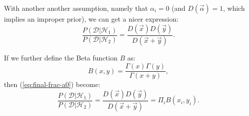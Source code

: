 \documentclass{article}
\let\product\Pi
\begin{document}
With another another assumption, namely that $\alpha_i = 0$ (and $D(\vec\alpha)
= 1$, which implies an improper prior), we can get a nicer expression:
\begin{equation}
\frac{P(\mathcal{D}|\mathcal{H}_1)}{P(\mathcal{D}|\mathcal{H}_2)} = \frac{D(\vec{x})D(\vec{y})}{D(\vec{x}+\vec{y})}.
\label{eq:final-frac-a0}
\end{equation}

If we further define the Beta function $B$ as:
\begin{equation}
B(x,y) = \frac{\Gamma(x)\Gamma(y)}{\Gamma(x+y)},
\end{equation}
then (\ref{eq:final-frac-a0}) become:
\begin{equation}
\frac{P(\mathcal{D}|\mathcal{H}_1)}{P(\mathcal{D}|\mathcal{H}_2)} =
        \frac{D(\vec{x})D(\vec{y})}{D(\vec{x}+\vec{y})} =
        \product_i B(x_i, y_i).
\end{equation}
\end{document}
